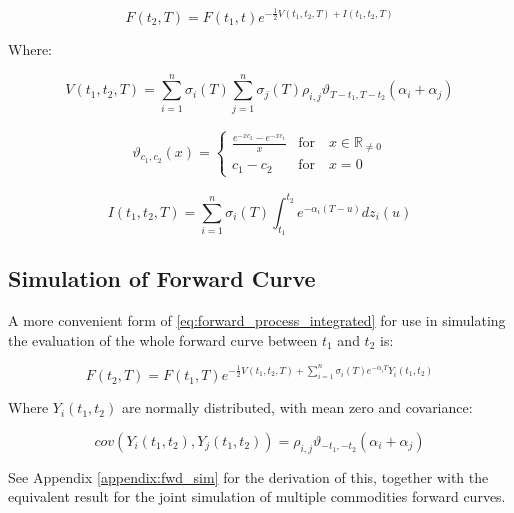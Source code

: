 \documentclass{article}
\begin{document}
\begin{equation}
    \label{eq:forward_process_integrated}
    F(t_2, T) = F(t_1, t)e^{- \frac{1}{2} V(t_1, t_2, T) + I(t_1, t_2, T)}
\end{equation}

Where:

\begin{equation}
    \nonumber
    V(t_1, t_2, T) = \sum_{i=1}^n \sigma_i(T) \sum_{j=1}^n \sigma_j(T) \rho_{i,j} 
    \vartheta_{T-t_1, T-t_2}(\alpha_i + \alpha_j)
\end{equation}

\begin{align}
    \vartheta_{c_1, c_2}(x) = 
    \begin{cases}
        \frac{e^{-x c_2} - e^{-x c_1}}{x} & \text{for} \quad x \in \mathbb{R}_{\ne 0} \\
        c_1 - c_2 & \text{for} \quad x=0
    \end{cases}
\end{align}

\begin{equation}
    I(t_1, t_2, T) = \sum_{i=1}^n \sigma_i(T) \int_{t_1}^{t_2} e^{-\alpha_i(T-u)}dz_i(u)
\end{equation}

\subsection{Simulation of Forward Curve}
A more convenient form of \ref{eq:forward_process_integrated} for use in simulating
the evaluation of the whole forward curve between $t_1$ and $t_2$ is:

\begin{equation}
    F(t_2, T) = F(t_1, T)e^{- \frac{1}{2} V(t_1, t_2, T) + 
        \sum_{i=1}^n \sigma_i(T) e^{-\alpha_i T} Y_i(t_1, t_2) }
\end{equation}

Where $Y_i(t_1, t_2)$ are normally distributed, with mean zero and covariance:

\begin{equation}
    cov(Y_i(t_1, t_2), Y_j(t_1, t_2)) = \rho_{i, j} \vartheta_{-t_1, -t_2}(\alpha_i + \alpha_j)
\end{equation}

\bigskip

See Appendix \ref{appendix:fwd_sim} for the derivation of this, together with
the equivalent result for the joint simulation of multiple commodities forward curves.
\end{document}
